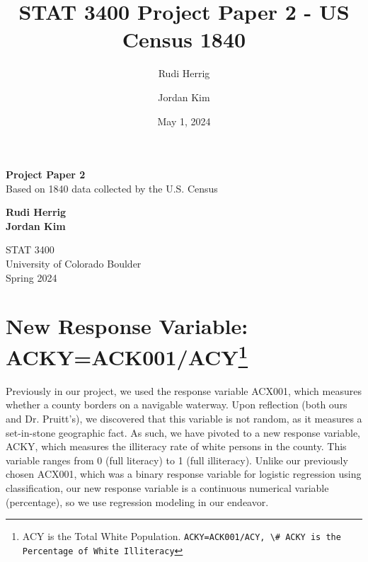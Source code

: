 \documentclass[a4paper,12pt]{article}
\title{STAT 3400 Project Paper 2 - US Census 1840}
\author{Rudi Herrig \and Jordan Kim}
\date{May 1, 2024}
\begin{document}











\begin{titlepage}
    \begin{center}
        \vspace*{2in}
            \huge
            \textbf{Project Paper 2}\\
             Based on 1840 data collected by the U.S. Census\\
        
        \vspace*{2 in}
        
            \normalsize
                \textbf{Rudi Herrig} \\
                \textbf{Jordan Kim} \\
                
                
        \vspace*{0.5in}
        
            STAT 3400\\
            University of Colorado Boulder\\
            Spring 2024
        
    \end{center}
\end{titlepage}



\section{New Response Variable: ACKY=ACK001/ACY\footnote{ACY is the Total White Population. \lstinline{ACKY=ACK001/ACY, \# ACKY is the Percentage of White Illiteracy}}}
\newline
Previously in our project, we used the response variable ACX001, which measures whether a county borders on a navigable waterway. Upon reflection (both ours and Dr. Pruitt's), we discovered that this variable is not random, as it measures a set-in-stone geographic fact. As such, we have pivoted to a new response variable, ACKY, which measures the illiteracy rate of white persons in the county. This variable ranges from 0 (full literacy) to 1 (full illiteracy). Unlike our previously chosen ACX001, which was a binary response variable for logistic regression using classification, our new response variable is a continuous numerical variable (percentage), so we use regression modeling in our endeavor.
\end{document}
